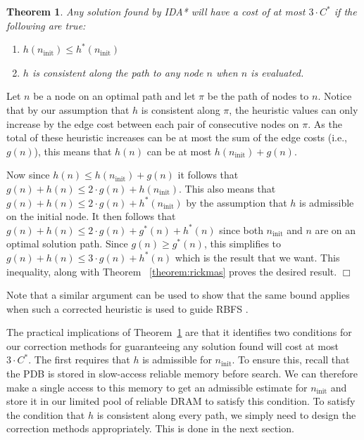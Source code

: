 \documentclass[letterpaper]{article}
\newtheorem{theorem}{Theorem}
\newenvironment{proof}{\par\noindent{\em Proof.}}{\hfill $\Box$\medskip}
\begin{document}
\begin{theorem}
Any solution found by IDA* will have a cost of at most $3 \cdot C^*$ if the following are true:
\begin{enumerate}
    \item $h(n_{\mathrm{init}}) \leq h^*(n_{\mathrm{init}})$
    \item $h$ is consistent along the path to any node $n$ when $n$ is evaluated.
\end{enumerate}
\label{the:h_increase_policy}
\end{theorem}
\begin{proof}
Let $n$ be a node on an optimal path %
and let $\pi$ be the path of nodes to $n$.
Notice that by our assumption that $h$ is consistent along $\pi$, the heuristic values can only increase by the edge cost between each pair of consecutive nodes on $\pi$.
As the total of these heuristic increases can be at most the sum of the edge costs (i.e., $g(n)$), this means that $h(n)$ can be at most $h(n_{\mathrm{init}}) + g(n)$.

Now since $h(n) \leq h(n_{\mathrm{init}}) + g(n)$ it follows that $g(n) + h(n) \leq 2 \cdot g(n) + h(n_{\mathrm{init}})$. This also means that $g(n) + h(n) \leq 2 \cdot g(n) + h^*(n_{\mathrm{init}})$ by the assumption that $h$ is admissible on the initial node.
It then follows that $g(n) + h(n) \leq 2 \cdot g(n) + g^*(n) + h^*(n)$ since
both $n_{\mathrm{init}}$ and $n$ are on an optimal solution path.
Since $g(n) \geq g^*(n)$, this simplifies to $g(n) + h(n) \leq 3 \cdot g(n) + h^*(n)$ which is the result that we want. This inequality, along with Theorem
~\ref{theorem:rickmas}
proves the desired result.
\end{proof}

Note that a similar argument can be used to show that the same bound applies when such a corrected heuristic is used to guide RBFS \cite{Korf1992}.





The practical implications of Theorem~\ref{the:h_increase_policy} are that it identifies two conditions for our correction methods for guaranteeing any solution found will cost at most $3 \cdot C^*$. The first requires that $h$ is admissible for $n_{\mathrm{init}}$. To ensure this, recall that the PDB is stored in slow-access reliable memory before search.
We can therefore make a single access to this memory to get an admissible estimate for $n_{\mathrm{init}}$ and store it in our limited pool of reliable DRAM to satisfy this condition.
To satisfy the condition that $h$ is consistent along every path, we simply need to design the correction methods appropriately. This is done in the next section.
\end{document}

